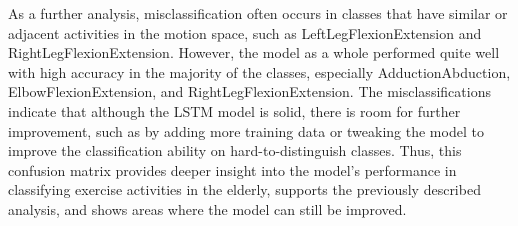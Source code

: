 As a further analysis, misclassification often occurs in classes that have similar or adjacent activities in the motion space, such as LeftLegFlexionExtension and RightLegFlexionExtension. However, the model as a whole performed quite well with high accuracy in the majority of the classes, especially AdductionAbduction, ElbowFlexionExtension, and RightLegFlexionExtension. The misclassifications indicate that although the LSTM model is solid, there is room for further improvement, such as by adding more training data or tweaking the model to improve the classification ability on hard-to-distinguish classes. Thus, this confusion matrix provides deeper insight into the model's performance in classifying exercise activities in the elderly, supports the previously described analysis, and shows areas where the model can still be improved.

